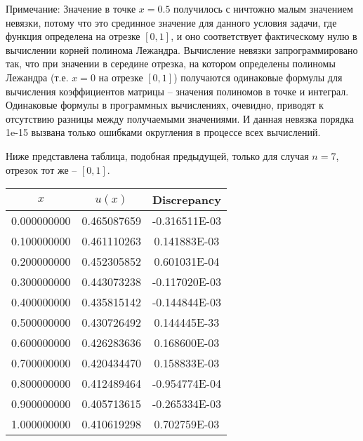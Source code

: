\documentclass[12pt,a4paper]{article}
\begin{document}
Примечание: Значение в точке $x=0.5$ получилось с ничтожно малым значением невязки, потому что это срединное значение для данного условия задачи, где функция определена на отрезке $[0,1]$, и оно соответствует фактическому нулю в вычислении корней полинома Лежандра. Вычисление невязки запрограммировано так, что при значении в середине отрезка, на котором определены полиномы Лежандра (т.е. $x=0$ на отрезке $[0,1]$) получаются одинаковые формулы для вычисления коэффициентов матрицы -- значения полиномов в точке и интеграл. Одинаковые формулы в программных вычислениях, очевидно, приводят к отсутствию разницы между получаемыми значениями. И данная невязка порядка 1e-15 вызвана только ошибками округления в процессе всех вычислений.

Ниже представлена таблица, подобная предыдущей, только для случая $n=7$, отрезок тот же -- $[0,1]$.

\begin{center} 
\begin{tabular}{|c|c|c|}
\hline
         $x$    &     $u(x)$    &   Discrepancy \\
\hline
    0.000000000 & 0.465087659 & -0.316511E-03 \\
\hline    
    0.100000000 & 0.461110263 &  0.141883E-03 \\
\hline    
    0.200000000 & 0.452305852 &  0.601031E-04 \\
\hline    
    0.300000000 & 0.443073238 & -0.117020E-03 \\
\hline    
    0.400000000 & 0.435815142 & -0.144844E-03 \\
\hline    
    0.500000000 & 0.430726492 &  0.144445E-33 \\
\hline    
    0.600000000 & 0.426283636 &  0.168600E-03 \\
\hline    
    0.700000000 & 0.420434470 &  0.158833E-03 \\
\hline    
    0.800000000 & 0.412489464 & -0.954774E-04 \\
\hline    
    0.900000000 & 0.405713615 & -0.265334E-03 \\
\hline    
    1.000000000 & 0.410619298 &  0.702759E-03 \\
\hline
\end{tabular}
\end{center}
\end{document}
